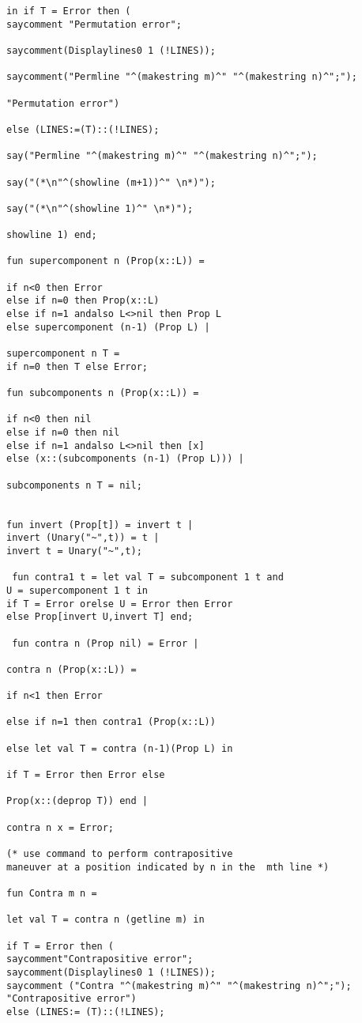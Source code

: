 \documentclass{article}
\begin{document}
{{\begin{verbatim}
in if T = Error then (
saycomment "Permutation error";

saycomment(Displaylines0 1 (!LINES));

saycomment("Permline "^(makestring m)^" "^(makestring n)^";");

"Permutation error")

else (LINES:=(T)::(!LINES);

say("Permline "^(makestring m)^" "^(makestring n)^";");

say("(*\n"^(showline (m+1))^" \n*)"); 

say("(*\n"^(showline 1)^" \n*)");

showline 1) end;

fun supercomponent n (Prop(x::L)) =

if n<0 then Error
else if n=0 then Prop(x::L)
else if n=1 andalso L<>nil then Prop L
else supercomponent (n-1) (Prop L) |

supercomponent n T =
if n=0 then T else Error;

fun subcomponents n (Prop(x::L)) =

if n<0 then nil
else if n=0 then nil
else if n=1 andalso L<>nil then [x]
else (x::(subcomponents (n-1) (Prop L))) |

subcomponents n T = nil;


fun invert (Prop[t]) = invert t |
invert (Unary("~",t)) = t |
invert t = Unary("~",t);

 fun contra1 t = let val T = subcomponent 1 t and
U = supercomponent 1 t in
if T = Error orelse U = Error then Error
else Prop[invert U,invert T] end; 

 fun contra n (Prop nil) = Error |

contra n (Prop(x::L)) =

if n<1 then Error

else if n=1 then contra1 (Prop(x::L))

else let val T = contra (n-1)(Prop L) in

if T = Error then Error else

Prop(x::(deprop T)) end |

contra n x = Error; 

(* use command to perform contrapositive
maneuver at a position indicated by n in the  mth line *)

fun Contra m n =

let val T = contra n (getline m) in

if T = Error then (
saycomment"Contrapositive error";
saycomment(Displaylines0 1 (!LINES));
saycomment ("Contra "^(makestring m)^" "^(makestring n)^";");
"Contrapositive error")
else (LINES:= (T)::(!LINES);


\end{verbatim}}}
\end{document}
